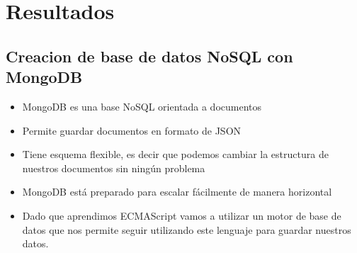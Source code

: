 \documentclass[%
 reprint,
 amsmath,amssymb,
 aps,
]{revtex4-1}
\begin{document}
\section {Resultados}\label{sec:4}
\subsection{Creacion de base de datos NoSQL con MongoDB}
                     \begin{itemize}
		\item MongoDB es una base NoSQL orientada a documentos
		\item Permite guardar documentos en formato de JSON
		\item Tiene esquema flexible, es decir que podemos cambiar la estructura de nuestros documentos sin ningún problema
                     \item MongoDB está preparado para escalar fácilmente de manera horizontal
                     \item Dado que aprendimos ECMAScript vamos a utilizar un motor de base de datos que nos permite seguir utilizando este lenguaje para guardar nuestros datos.
                     \end{itemize}
\end{document}
